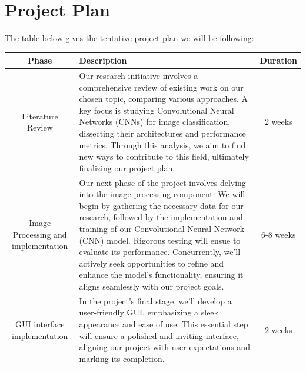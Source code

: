 \documentclass{article}
\begin{document}
\section{Project Plan}
The table below gives the tentative project plan we will be following:
\begin{center}
\begin{table}[H]
\centering
\begin{longtable}{|c|p{}|c|}
\hline
Phase & Description & Duration \\
\hline
Literature Review & Our research initiative involves a comprehensive review of existing work on our chosen topic, comparing various approaches. A key focus is studying Convolutional Neural Networks (CNNs) for image classification, dissecting their architectures and performance metrics. Through this analysis, we aim to find new ways to contribute to this field, ultimately finalizing our project plan. & 2 weeks \\
\endfirsthead
\hline
Image Processing and implementation & Our next phase of the project involves delving into the image processing component. We will begin by gathering the necessary data for our research, followed by the implementation and training of our Convolutional Neural Network (CNN) model. Rigorous testing will ensue to evaluate its performance. Concurrently, we'll actively seek opportunities to refine and enhance the model's functionality, ensuring it aligns seamlessly with our project goals. & 6-8 weeks \\
\hline
GUI interface implementation & In the project's final stage, we'll develop a user-friendly GUI, emphasizing a sleek appearance and ease of use. This essential step will ensure a polished and inviting interface, aligning our project with user expectations and marking its completion. & 2 weeks \\\hline
\end{longtable}
\end{table}
\end{center}
\end{document}
